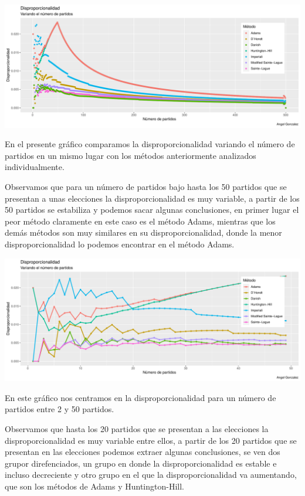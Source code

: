 \documentclass[12pt,a4paper,]{book}
\numberwithin{dummy}{section}
\theoremstyle{ocrenumbox}
\theoremstyle{blacknumex}
\theoremstyle{blacknumbox}
\theoremstyle{ocrenum}
\theoremstyle{ocrenum}
\begin{document}
\begin{center}\includegraphics[width=0.95\linewidth]{figurasR/unnamed-chunk-44-1} \end{center}

En el presente gráfico comparamos la disproporcionalidad variando el
número de partidos en un mismo lugar con los métodos anteriormente
analizados individualmente.

Observamos que para un número de partidos bajo hasta los 50 partidos que
se presentan a unas elecciones la disproporcionalidad es muy variable, a
partir de los 50 partidos se estabiliza y podemos sacar algunas
conclusiones, en primer lugar el peor método claramente en este caso es
el método Adams, mientras que los demás métodos son muy similares en su
disproporcionalidad, donde la menor disproporcionalidad lo podemos
encontrar en el método Adams.

\begin{center}\includegraphics[width=0.95\linewidth]{figurasR/unnamed-chunk-45-1} \end{center}

En este gráfico nos centramos en la disproporcionalidad para un número
de partidos entre 2 y 50 partidos.

Observamos que hasta los 20 partidos que se presentan a las elecciones
la disproporcionalidad es muy variable entre ellos, a partir de los 20
partidos que se presentan en las elecciones podemos extraer algunas
conclusiones, se ven dos grupor direfenciados, un grupo en donde la
disproporcionalidad es estable e incluso decreciente y otro grupo en el
que la disproporcionalidad va aumentando, que son los métodos de Adams y
Huntington-Hill.
\end{document}
